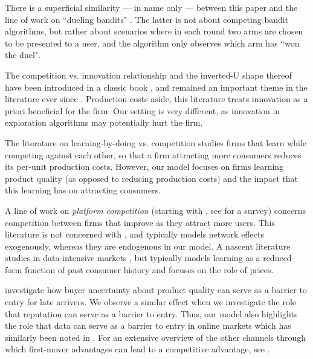 There is a superficial similarity --- in name only --- between this paper and the line of work on ``dueling bandits"
    \citep[\eg][]{Yue-dueling12,Yue-dueling-icml09}.
The latter is not about competing bandit algorithms, but rather about scenarios where in each round two arms are chosen to be presented to a user, and the algorithm only observes which arm has ``won the duel".

 The competition vs. innovation relationship and the inverted-U shape thereof have been introduced in a classic book \citep{Schumpeter-42}, and remained an important theme in the literature ever since \cite[\eg][]{aghion2005competition,Vives-08}. Production costs aside, this literature treats innovation as a priori beneficial for the firm. Our setting is very different, as innovation in exploration algorithms may potentially hurt the firm.

The literature on learning-by-doing vs. competition \citep[\eg][]{fudenberg1983learning, dasgupta1988learning, cabral1994learning} studies firms that learn while competing against each other, so that a firm attracting more consumers reduces its per-unit production costs. However, our model focuses on firms learning product quality (as opposed to reducing production costs) and the impact that this learning has on attracting consumers.

A line of work on \emph{platform competition} (starting with \cite{Rysman09}, see \citet{Weyl-White-14} for a survey) concerns competition between firms that improve as they attract more users. This literature is not concerned with \innovation, and typically models network effects exogenously, whereas they are endogenous in our model.
A nascent literature studies 
in data-intensive markets \citep{prufer2017competing, hagiu2020data}, but typically models learning as a reduced-form function of past consumer history and focuses on the role of prices.

\cite{schmalensee1982product, bagwell1990informational} investigate how buyer uncertainty about product quality can serve as a barrier to entry for late arrivers. We observe a similar effect when we investigate the role that reputation can serve as a barrier to entry. 
Thus, our model also highlights the role that data can serve as a barrier to entry in online markets which has similarly been noted in \cite{de2020data}. For an extensive overview of the other channels through which first-mover advantages can lead to a competitive advantage, see \cite{kerin1992first}.

